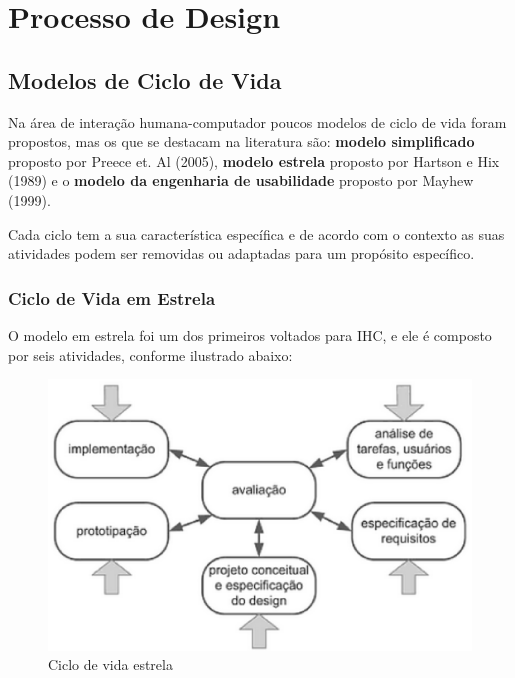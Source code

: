 \chapter[Processo de Design]{Processo de Design}

\section{Modelos de Ciclo de Vida}

Na área de interação humana-computador poucos modelos de ciclo de vida foram propostos, mas os que se destacam na literatura são: \textbf{modelo simplificado} proposto por Preece et. Al (2005), \textbf{modelo estrela} proposto por Hartson e Hix (1989) e o \textbf{modelo da engenharia de usabilidade} proposto por Mayhew (1999).

Cada ciclo tem a sua característica específica e de acordo com o contexto as suas atividades podem ser removidas ou adaptadas para um propósito específico.

\subsection{Ciclo de Vida em Estrela}
O modelo em estrela foi um dos primeiros voltados para IHC, e ele é composto por seis atividades, conforme ilustrado abaixo:

\begin{figure}[H]
	\centering
	\includegraphics[scale=0.5]{figuras/modelo_estrela.eps}
	\caption{Ciclo de vida estrela}
\end{figure}

